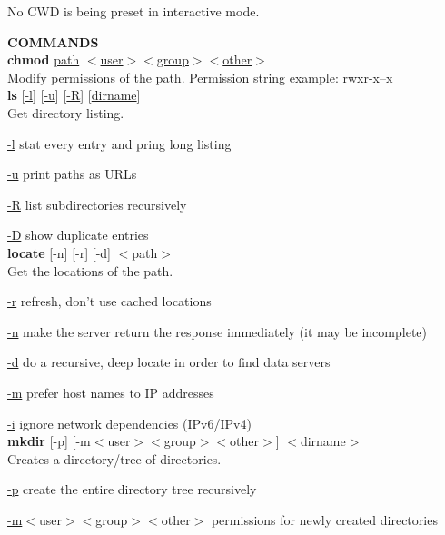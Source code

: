 \documentclass{article}
\begin{document}
        \noindent No CWD is being preset in interactive mode. \\
        
        \pagebreak
        
        \noindent \textbf{COMMANDS} \\
        
        \noindent \textbf{chmod} \underline{path} $<$\underline{user}$>$$<$\underline{group}$>$$<$\underline{other}$>$ \\
        \noindent Modify permissions of the path. Permission string example: rwxr-x--x \\

        \noindent \textbf{ls} [\underline{-l}] [\underline{-u}] [\underline{-R}] [\underline{dirname}] \\
        Get directory listing. 
        
        \underline{-l} stat every entry and pring long listing
        
        \underline{-u} print paths as URLs
        
        \underline{-R} list subdirectories recursively
         
        \underline{-D} show duplicate entries \\ 

        \noindent \textbf{locate} [-n] [-r] [-d] $<$path$>$ \\
        Get the locations of the path.
        
        \underline{-r} refresh, don't use cached locations
          
        \underline{-n} make the server return the response immediately (it may be incomplete)
          
        \underline{-d} do a recursive, deep locate in order to find data servers
          
        \underline{-m} prefer host names to IP addresses
          
        \underline{-i} ignore network dependencies (IPv6/IPv4) \\

        \noindent \textbf{mkdir} [-p] [-m$<$user$>$$<$group$>$$<$other$>$] $<$dirname$>$ \\
        Creates a directory/tree of directories.
        
        \underline{-p} create the entire directory tree recursively
        
        \underline{-m}$<$user$>$$<$group$>$$<$other$>$ permissions for newly created directories \\
\end{document}
